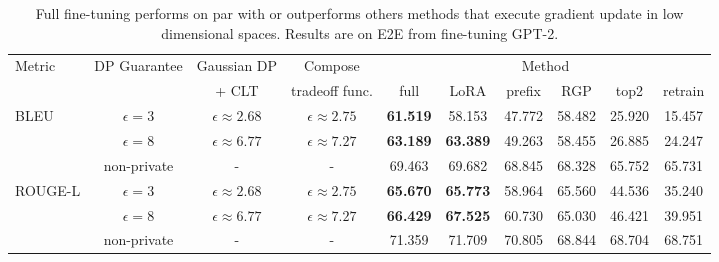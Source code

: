 \setlength{\tabcolsep}{2.5pt}
\renewcommand{\arraystretch}{0.75}
\begin{table}[thb]
\footnotesize
\caption{
Full fine-tuning performs on par with or outperforms others methods that execute gradient update in low dimensional spaces.
Results are on E2E from fine-tuning GPT-2.
}
\centering
\begin{tabular}{l c c c cccccc}
\toprule
\multirow{2}[0]{*}{Metric} & \multirow{2}[0]{*}{DP Guarantee} & Gaussian DP & Compose & \multicolumn{6}{c}{Method}  \\
 & & + CLT & tradeoff func. & {full} & {LoRA} & {prefix} & {RGP} & {top2} & {retrain} \\

\midrule
\multirow{3}[1]{*}{BLEU}
 & $\epsilon=3$ & $\epsilon \approx 2.68$ & $\epsilon \approx 2.75$ & \textbf{ 61.519 } & 58.153 & 47.772 & 58.482 & 25.920 & 15.457\\
 & $\epsilon=8$ & $\epsilon \approx 6.77$ & $\epsilon \approx 7.27$ & \textbf{63.189} & \textbf{ 63.389 } & 49.263 & 58.455 & 26.885 & 24.247\\
 & non-private & - & - & 69.463 & 69.682 & 68.845 & 68.328 & 65.752 & 65.731\\
\midrule
\multirow{3}[1]{*}{ROUGE-L}
 & $\epsilon=3$ & $\epsilon \approx 2.68$ & $\epsilon \approx 2.75$ & \textbf{65.670} & \textbf{ 65.773 } & 58.964 & 65.560 & 44.536 & 35.240\\
 & $\epsilon=8$ & $\epsilon \approx 6.77$ & $\epsilon \approx 7.27$ & \textbf{66.429} & \textbf{ 67.525 } & 60.730 & 65.030 & 46.421 & 39.951\\
 & non-private & - & - & 71.359 & 71.709 & 70.805 & 68.844 & 68.704 & 68.751\\
\bottomrule
\end{tabular}
\label{table:e2e_trim}
\end{table}
